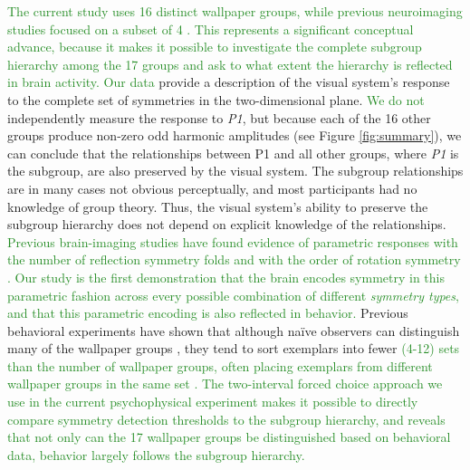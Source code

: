 \documentclass[11pt, twoside]{article}
\begin{document}
\textcolor{ForestGreen}{The current study uses 16 distinct wallpaper groups, while previous neuroimaging studies focused on a subset of 4 \citep{RN1725,RN1959}. This represents a significant conceptual advance, because it makes it possible to investigate the complete subgroup hierarchy among the 17 groups and ask to what extent the hierarchy is reflected in brain activity. Our data} provide a description of the visual system’s response to the complete set of symmetries in the two-dimensional plane. 
\textcolor{ForestGreen}{We do not} independently measure the response to \textit{P1}, but because each of the 16 other groups produce non-zero odd harmonic amplitudes (see Figure \ref{fig:summary}), we can conclude that the relationships between P1 and all other groups, where \textit{P1} is the subgroup, are also preserved by the visual system. The subgroup relationships are in many cases not obvious perceptually, and most participants had no knowledge of group theory. Thus, the visual system’s ability to preserve the subgroup hierarchy does not depend on explicit knowledge of the relationships. \textcolor{ForestGreen}{Previous brain-imaging studies have found evidence of parametric responses with the number of reflection symmetry folds \cite{keefe_2018, Sasaki_2005, makin_2016} and with the order of rotation symmetry \cite{RN1725}. Our study is the first demonstration that the brain encodes symmetry in this parametric fashion across every possible combination of different \textit{symmetry types}, and that this parametric encoding is also reflected in behavior.} Previous behavioral experiments have shown that although naïve observers can distinguish many of the wallpaper groups \citep{RN1253}, they tend to sort exemplars into fewer \textcolor{ForestGreen}{(4-12) sets than the number of wallpaper groups, often placing exemplars from different wallpaper groups in the same set \citep{RN172}. The two-interval forced choice approach we use in the current psychophysical experiment makes it possible to directly compare symmetry detection thresholds to the subgroup hierarchy, and reveals that not only can the 17 wallpaper groups be distinguished based on behavioral data, behavior largely follows the subgroup hierarchy.}  
\end{document}
